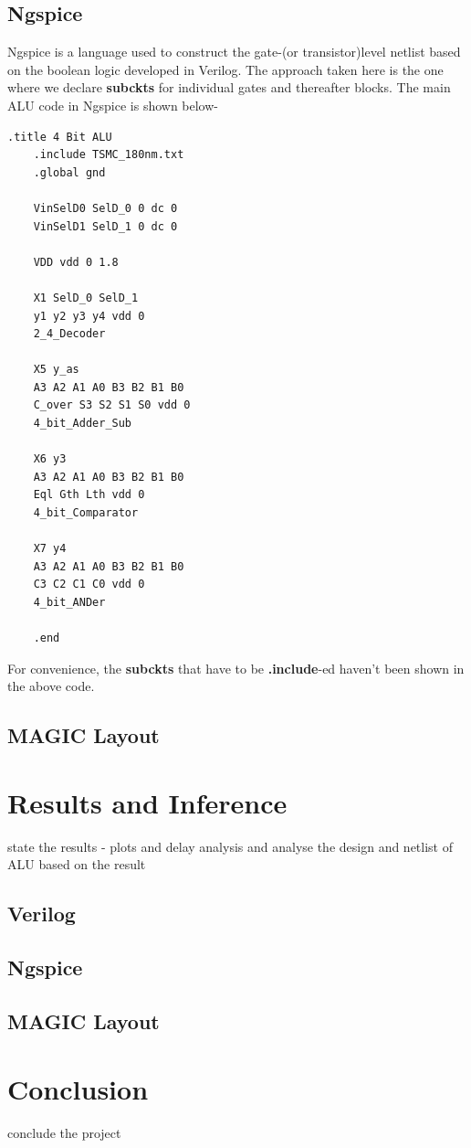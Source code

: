\documentclass[a4paper, titlepage]{article}
\begin{document}
\subsection{Ngspice}
Ngspice is a language used to construct the gate-(or transistor)level netlist based on the boolean logic developed in
Verilog. The approach taken here is the one where we declare \textbf{subckts} for individual gates and thereafter blocks.
The main ALU code in Ngspice is shown below-
\begin{multicols}{2}
\setlength{\columnseprule}{0.4pt}
\begin{lstlisting}[language = SPICE]
    .title 4 Bit ALU
    .include TSMC_180nm.txt
    .global gnd
    
    VinSelD0 SelD_0 0 dc 0
    VinSelD1 SelD_1 0 dc 0
    
    VDD vdd 0 1.8
    
    X1 SelD_0 SelD_1 
    y1 y2 y3 y4 vdd 0 
    2_4_Decoder

    X5 y_as 
    A3 A2 A1 A0 B3 B2 B1 B0 
    C_over S3 S2 S1 S0 vdd 0 
    4_bit_Adder_Sub
    
    X6 y3 
    A3 A2 A1 A0 B3 B2 B1 B0 
    Eql Gth Lth vdd 0 
    4_bit_Comparator
    
    X7 y4 
    A3 A2 A1 A0 B3 B2 B1 B0 
    C3 C2 C1 C0 vdd 0 
    4_bit_ANDer
    
    .end
\end{lstlisting}
\end{multicols}
For convenience, the \textbf{subckts} that have to be \textbf{.include}-ed haven't been shown in the above code.

\subsection{MAGIC Layout}
\section{Results and Inference}
state the results - plots and delay analysis and analyse the design and netlist 
of ALU based on the result 
\subsection{Verilog}
\subsection{Ngspice}
\subsection{MAGIC Layout}
\section{Conclusion}
conclude the project
\end{document}
